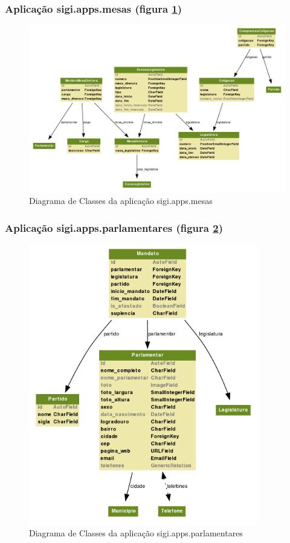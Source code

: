 \subsubsection{Aplicação sigi.apps.mesas (figura \ref{fig:mesas})}
\begin{figure}[h!]
  \centering
  \includegraphics[width=145mm]{../imagens/mesas.png}
  \caption{Diagrama de Classes da aplicação sigi.apps.mesas}
  \label{fig:mesas}
\end{figure}

\subsubsection{Aplicação sigi.apps.parlamentares (figura \ref{fig:parlamentares})}
\begin{figure}[h!]
  \centering
  \includegraphics[width=100mm]{../imagens/parlamentares.png}
  \caption{Diagrama de Classes da aplicação sigi.apps.parlamentares}
  \label{fig:parlamentares}
\end{figure}

